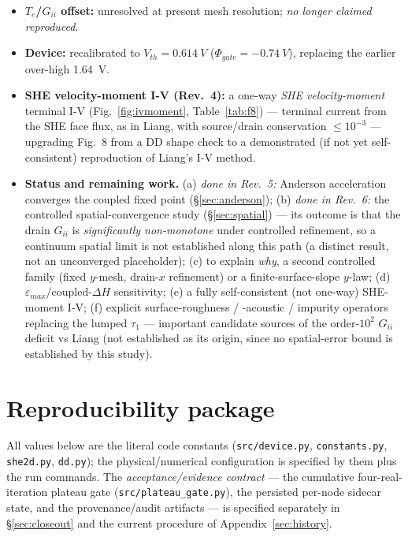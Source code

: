 \documentclass[11pt]{article}
\newcommand{\eps}{\varepsilon}
\begin{document}
\begin{itemize}[leftmargin=1.4em,itemsep=2pt]
single-power Richardson model does not apply, so \emph{spatial convergence is not demonstrated and no
continuum $G_{ii}$ is inferred from this trio} (not a proof that no limit exists). The
controlled-campaign classification is \textbf{YELLOW}, re-derived after a plateau-measurement
bookkeeping repair (\S\ref{sec:closeout}): the non-monotone verdict reproduces, one accepted node
lies outside the $2\%$ numerical band. The earlier uniform sequence was itself
drain-under-resolved; and a 60-iteration budget produced materially biased fixed-point transients
(up to $+18\%$), so the verdict rests on equalized, plateau-gated nodes.
\item \textbf{$T_e$/$G_{ii}$ offset:} unresolved at present mesh resolution; \emph{no longer
claimed reproduced}.
\item \textbf{Device:} recalibrated to $V_{th}=\SI{0.614}{V}$ ($\Phi_{gate}=\SI{-0.74}{V}$),
replacing the earlier over-high \SI{1.64}{V}.
\item \textbf{SHE velocity-moment I-V (Rev.~4):} a one-way \emph{SHE velocity-moment} terminal I-V
(Fig.~\ref{fig:ivmoment}, Table~\ref{tab:f8}) --- terminal current from the SHE face flux, as in
Liang, with source/drain conservation $\le10^{-3}$ --- upgrading Fig.~8 from a DD shape check to a
demonstrated (if not yet self-consistent) reproduction of Liang's I-V method.
\item \textbf{Status and remaining work.} (a) \emph{done in Rev.~5:} Anderson acceleration converges the coupled
fixed point (\S\ref{sec:anderson}); (b) \emph{done in Rev.~6:} the controlled spatial-convergence
study (\S\ref{sec:spatial}) --- its outcome is that the drain $G_{ii}$ is \emph{significantly
non-monotone} under controlled refinement, so a continuum spatial limit is not established along this
path (a distinct result, not an unconverged placeholder); (c) to explain \emph{why}, a second
controlled family (fixed $y$-mesh, drain-$x$ refinement) or a finite-surface-slope $y$-law;
(d) $\eps_{max}$/coupled-$\Delta H$ sensitivity; (e) a fully self-consistent (not one-way) SHE-moment
I-V; (f) explicit surface-roughness / -acoustic / impurity operators replacing the lumped $\tau_1$ ---
important candidate sources of the order-$10^{2}$ $G_{ii}$ deficit vs Liang (not established as its
origin, since no spatial-error bound is established by this study).
\end{itemize}

\appendix
\section{Reproducibility package}\label{sec:specs}
All values below are the literal code constants (\texttt{src/device.py}, \texttt{constants.py},
\texttt{she2d.py}, \texttt{dd.py}); the physical/numerical configuration is specified by them plus the
run commands. The \emph{acceptance/evidence contract} --- the cumulative four-real-iteration plateau
gate (\texttt{src/plateau\_gate.py}), the persisted per-node sidecar state, and the provenance/audit
artifacts --- is specified separately in \S\ref{sec:closeout} and the current procedure of
Appendix~\ref{sec:history}.
\end{document}
